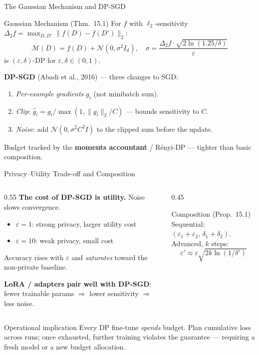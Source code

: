 \documentclass[9pt,t]{beamer}
\begin{document}
\begin{frame}{The Gaussian Mechanism and DP-SGD}
\begin{block}{Gaussian Mechanism (Thm.\ 15.1)}
For $f$ with $\ell_2$-sensitivity $\Delta_2 f = \max_{D,D'}\|f(D)-f(D')\|_2$:
\[
\mathcal{M}(D) = f(D) + \mathcal{N}(0,\sigma^2 I_d),\quad
\sigma = \frac{\Delta_2 f \cdot \sqrt{2\ln(1.25/\delta)}}{\varepsilon}
\]
is $(\varepsilon,\delta)$-DP for $\varepsilon,\delta \in (0,1)$.
\end{block}

\medskip
\begin{underhood}
\textbf{DP-SGD} (Abadi et al., 2016) --- three changes to SGD:
\begin{enumerate}
  \item \emph{Per-example gradients} $g_i$ (not minibatch sum).
  \item \emph{Clip}: $\hat{g}_i = g_i / \max(1, \|g_i\|_2/C)$ --- bounds sensitivity to $C$.
  \item \emph{Noise}: add $\mathcal{N}(0, \sigma^2 C^2 I)$ to the clipped sum before the update.
\end{enumerate}
Budget tracked by the \textbf{moments accountant} / R\'enyi-DP --- tighter than basic
composition.
\end{underhood}
\end{frame}

\begin{frame}{Privacy--Utility Trade-off and Composition}
\begin{columns}[T]
\begin{column}{0.55\textwidth}
\textbf{The cost of DP-SGD is utility.} Noise slows convergence.
\begin{itemize}
  \item $\varepsilon = 1$: strong privacy, larger utility cost
  \item $\varepsilon = 10$: weak privacy, small cost
\end{itemize}
Accuracy rises with $\varepsilon$ and \emph{saturates} toward the non-private baseline.

\medskip
\textbf{LoRA / adapters pair well with DP-SGD}: fewer trainable params $\Rightarrow$
lower sensitivity $\Rightarrow$ less noise.
\end{column}
\begin{column}{0.45\textwidth}
\begin{block}{Composition (Prop.\ 15.1)}
Sequential: $(\varepsilon_1{+}\varepsilon_2,\,\delta_1{+}\delta_2)$.\\[4pt]
Advanced, $k$ steps:
\[
\varepsilon' \approx \varepsilon\sqrt{2k\ln(1/\delta')}
\]
\end{block}
\end{column}
\end{columns}

\medskip
\begin{alertblock}{Operational implication}
Every DP fine-tune \emph{spends} budget. Plan cumulative loss across runs; once
exhausted, further training violates the guarantee --- requiring a fresh model or a
new budget allocation.
\end{alertblock}
\end{frame}
\end{document}
